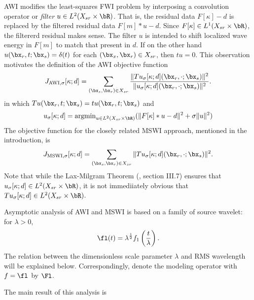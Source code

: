 AWI modifies the least-squares FWI problem by interposing a convolution operator or
{\em filter} $u \in L^2(X_{sr} \times \bR)$. That is, the residual
data $F[\kappa]-d$ is replaced by the filtered residual data $F[m]*u-d$.
Since $F[\kappa] \in L^1(X_{sr}\times \bR)$, the filtererd residual
makes sense.
The filter $u$ is intended to shift localized wave energy in $F[m]$ to
match that present in $d$. If on the other hand $u(\bx_r,t;\bx_s) =
\delta(t)$ for each $(\bx_x,\bx_r) \in X_{sr}$, then $tu = 0$. This
observation motivates the definition of the AWI objective function
\begin{equation}
  \label{eqn:awidefmain}
  J_{\rm AWI,\sigma}[\kappa;d] = \sum_{(\bx_s,\bx_r) \in X_{sr}}
  \frac{\|Tu_{\sigma}[\kappa;d](\bx_r,\cdot;\bx_s)\|^2}{\|u_{\sigma}[\kappa;d](\bx_r,\cdot;\bx_s)\|^2}.
\end{equation}
in which $Tu(\bx_r,t;\bx_s) = tu(\bx_r,t;\bx_s)$ and
\begin{equation}
  \label{eqn:reg}
  u_{\sigma}[\kappa;d] = \mbox{argmin}_{u \in L^2(X_{sr} \times \bR)} (\|F[\kappa]*u-d\|^2 + \sigma\|u\|^2)
\end{equation}
The objective function for the closely related MSWI approach,
mentioned in the introduction, is  
\begin{equation}
  \label{eqn:mswidefmain}
  J_{\rm MSWI,\sigma}[\kappa;d] = \sum_{(\bx_s,\bx_r) \in X_{sr}}
  \|Tu_{\sigma}[\kappa;d](\bx_r,\cdot;\bx_s)\|^2.
\end{equation}
Note that while the Lax-Milgram Theorem (\cite{Yosida}, section
III.7) ensures that $u_{\sigma}[\kappa;d] \in L^2(X_{sr}\times \bR)$,
it is not immediiately obvious that $Tu_{\sigma}[\kappa;d] \in L^2(X_{sr}\times \bR)$.

Asymptotic analysis of AWI and MSWI is based on a family of source
wavelet: for $\lambda > 0$,
\begin{equation}
  \fl(t)= \lambda^{\frac{1}{2}}f_1\left(\frac{t}{\lambda}\right).
\end{equation}
The relation between the dimensionless scale parameter $\lambda$ and
RMS wavelength will be explained below. Correspondingly, denote the
modeling operator with $f=\fl$ by $\Fl$.

The main result of this analysis is

